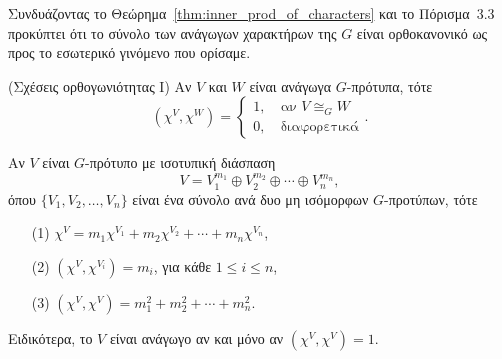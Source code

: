 \documentclass[12pt,a4paper,reqno]{amsart}
\begin{document}
Συνδυάζοντας το Θεώρημα~\ref{thm:inner_prod_of_characters} και το Πόρισμα~3.3 προκύπτει ότι το σύνολο των ανάγωγων χαρακτήρων της $G$ είναι ορθοκανονικό ως προς το εσωτερικό γινόμενο που ορίσαμε.

\begin{theorem}{\rm(Σχέσεις ορθογωνιότητας Ι)}
    \label{thm:orthogonality_rels_I}
    Αν $V$ και $W$ είναι ανάγωγα $G$-πρότυπα, τότε 
    \[
    (\chi^V,\chi^W) = 
    \begin{cases}
        1, &\ \text{αν $V\cong_G{W}$} \\
        0, &\ \text{διαφορετικά}
    \end{cases}.
    \]
\end{theorem}

\begin{corollary}
    \label{cor:orthogonality_rels_I}
    Αν $V$ είναι $G$-πρότυπο με ισοτυπική διάσπαση 
    \[
    V = V_1^{m_1} \oplus V_2^{m_2} \oplus \cdots \oplus V_n^{m_n},
    \]
    όπου $\{V_1, V_2, \dots, V_n\}$ είναι ένα σύνολο ανά δυο μη ισόμορφων $G$-προτύπων, τότε 
    \begin{itemize}
        \setlength{\itemsep}{4pt}
        \item[(1)] $\chi^V = m_1\chi^{V_1} + m_2\chi^{V_2} + \cdots + m_n\chi^{V_n}$,
        \item[(2)] $(\chi^V,\chi^{V_i}) = m_i$, για κάθε $1 \le i \le n$,
        \item[(3)] $(\chi^V,\chi^V) = m_1^2 + m_2^2 + \cdots + m_n^2$.
    \end{itemize}
    Ειδικότερα, το $V$ είναι ανάγωγο αν και μόνο αν $(\chi^V,\chi^V) = 1$.
\end{corollary}
\end{document}
